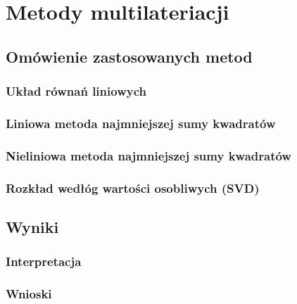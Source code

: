 \chapter{Metody multilateriacji}

\section{Omówienie zastosowanych metod}

\subsection{Układ równań liniowych}

\subsection{Liniowa metoda najmniejszej sumy kwadratów}

\subsection{Nieliniowa metoda najmniejszej sumy kwadratów}

\subsection{Rozkład wedłóg wartości osobliwych (SVD)}

\section{Wyniki}

\subsection{Interpretacja}

\subsection{Wnioski}